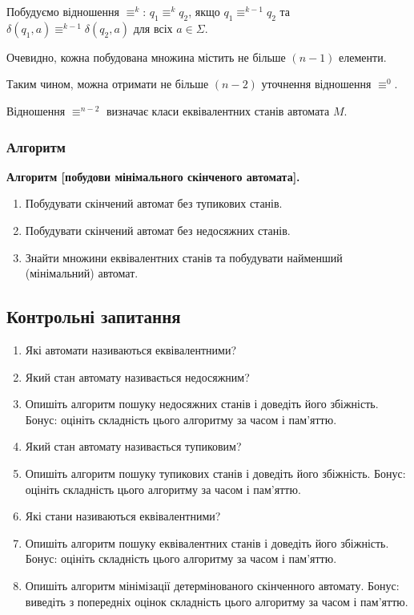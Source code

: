 Побудуємо відношення $\equiv^k$: $q_1 \equiv^k q_2$, якщо $q_1 \equiv^{k - 1} q_2$ та $\delta(q_1,a) \equiv^{k - 1} \delta(q_2, a)$ для всіх $a \in \Sigma$. \medskip

Очевидно, кожна побудована множина містить не більше $(n-1)$ елементи. \medskip

Таким чином, можна отримати не більше $(n-2)$ уточнення відношення $\equiv^0$. \medskip

Відношення $\equiv^{n - 2}$ визначає класи еквівалентних станів автомата $M$.

\subsubsection{Алгоритм}

\textbf{Алгоритм [побудови мінімального скінченого автомата].}
\begin{enumerate}
	\item Побудувати скінчений автомат без тупикових станів.
	\item Побудувати скінчений автомат без недосяжних станів.
	\item Знайти множини еквівалентних станів та побудувати найменший (мінімальний) автомат.
\end{enumerate}

\subsection{Контрольні запитання}

\begin{enumerate}
	\item Які автомати називаються еквівалентними? %
	\item Який стан автомату називається недосяжним? %
	\item Опишіть алгоритм пошуку недосяжних станів і доведіть його збіжність. Бонус: оцініть складність цього алгоритму за часом і пам'яттю.
	\item Який стан автомату називається тупиковим? %
	\item Опишіть алгоритм пошуку тупикових станів і доведіть його збіжність. Бонус: оцініть складність цього алгоритму за часом і пам'яттю.
	\item Які стани називаються еквівалентними? %
	\item Опишіть алгоритм пошуку еквівалентних станів і доведіть його збіжність. Бонус: оцініть складність цього алгоритму за часом і пам'яттю.
	\item Опишіть алгоритм мінімізації детермінованого скінченного автомату. Бонус: виведіть з попередніх оцінок складність цього алгоритму за часом і пам'яттю.
\end{enumerate}
